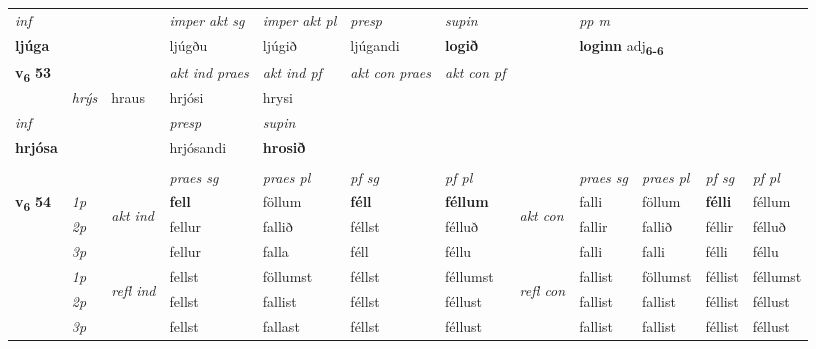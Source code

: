 \begin{longtable}[l]{X>{\footnotesize\itshape}llXXXXlXXXX}
   {\textit{inf}} & &  & \textit{imper akt sg} & \textit{imper akt pl}   & \textit{presp} & \textit{supin}  && \textit{pp m} \\*
  {\textbf{ljúga}} & && ljúgðu  & ljúgið   & ljúgandi &  \textbf{logið}  && \multicolumn{2}{l}{\textbf{loginn} adj\textbf{\textsubscript{6-6}}} \\*

\midrule

\multirow{2}{*}{{{\textbf{v{\textsubscript{6}}} \Large{\textbf{53}}}}}  &&&  \textit{akt ind praes} & \textit{akt ind pf} & \textit{akt con praes} & \textit{akt con pf} \\*
\multicolumn{3}{r}{\textit{e-m}} & hrýs & hraus & hrjósi & hrysi \\*

\cmidrule{4-7}
   {\textit{inf}} & &     & \textit{presp} & \textit{supin}   \\*
  {\textbf{hrjósa}} & &     & hrjósandi &  \textbf{hrosið}   \\*

\midrule
  & \\
   \midrule
 & &   & \textit{praes sg}  & \textit{praes pl}    & \textit{ pf sg} & \textit{pf pl} & & \textit{praes sg}  & \textit{praes pl}    & \textit{pf sg} & \textit{pf pl }  \\ \cmidrule{4-7} \cmidrule{9-12}
 \multirow{2}{*}{{{\textbf{v{\textsubscript{6}}} \Large{\textbf{54}}}}}  & 1p & \multirow{3}{*}{\begin{turn}{90}\textit{akt ind}\end{turn}} & \textbf{fell} & föllum & \textbf{féll} & \textbf{féllum} & \multirow{3}{*}{\begin{turn}{90}\textit{akt con}\end{turn}} &falli & föllum & \textbf{félli} & féllum\\*
 & 2p &  &  fellur  & fallið & féllst & félluð & & fallir & fallið & féllir & félluð \\*
 & 3p &  & fellur & falla & féll & féllu & & falli & falli& félli & féllu \\*
\cmidrule{4-7} \cmidrule{9-12}
 & 1p & \multirow{3}{*}{\begin{turn}{90}\textit{refl ind}\end{turn}}  & fellst & föllumst & féllst & féllumst & \multirow{3}{*}{\begin{turn}{90}\textit{refl con}\end{turn}}  &fallist & föllumst & féllist & féllumst \\*
 & 2p &  & fellst & fallist & féllst & féllust & &fallist & fallist & féllist & féllust \\*
 & 3p  & & fellst & fallast & féllst & féllust & & fallist & fallist& féllist & féllust \\*
\cmidrule{4-7} \cmidrule{9-12}


\end{longtable}
